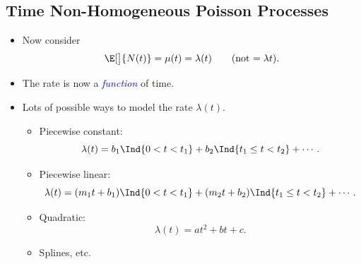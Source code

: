 \documentclass[oneside]{book}\usepackage[]{graphicx}\usepackage[svgnames]{xcolor}
\begin{document}
\subsection*{Time Non-Homogeneous Poisson Processes}
\begin{itemize}
      \item Now consider
            \[ \E[\big]{N(t)}=\mu(t)=\lambda(t)\qquad\text{(not $=\lambda t$)}. \]
      \item The rate is now a \emph{\textcolor{Blue}{function}} of time.
      \item Lots of possible ways to model the rate $ \lambda(t) $.
            \begin{itemize}
                  \item Piecewise constant:
                        \[ \lambda(t)=b_1\Ind{0<t<t_1}+b_2\Ind{t_1\le t<t_2}+\cdots. \]
                  \item Piecewise linear:
                        \[ \lambda(t)=(m_1 t+b_1)\Ind{0<t<t_1}+(m_2 t+b_2)\Ind{t_1\le t<t_2}+\cdots. \]
                  \item Quadratic:
                        \[ \lambda(t)=at^2+bt+c. \]
                  \item Splines, etc.
            \end{itemize}
\end{itemize}
\end{document}
